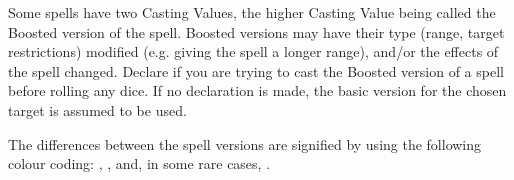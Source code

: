 
Some spells have two Casting Values, the higher Casting Value being called the Boosted version of the spell. Boosted versions may have their type (range, target restrictions) modified (e.g. giving the spell a longer range), and/or the effects of the spell changed. Declare if you are trying to cast the Boosted version of a spell before rolling any dice. If no declaration is made, the basic version for the chosen target is assumed to be used.

The differences between the spell versions are signified by using the following colour coding: , , and, in some rare cases, .














\tablelabels

\spelllabelandtitle{\attributespellnumber}{\alchemyattribute}

\tablespellcastingvalue{}
\tablespelltype{\hex}
\tablespellduration{\lastsoneturn}
\hline
{}

\tablespelltype{\hex\newline\missile\newline\damage}
\tablespellduration{\instant}
\hline
{}

\tablespelltype{\augment}
\tablespellduration{\lastsoneturn}
\hline
{}

